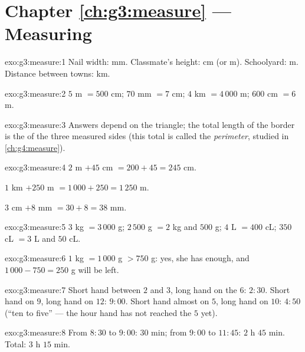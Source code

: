 \section*{Chapter \ref{ch:g3:measure} --- Measuring}

\begin{solution}{exo:g3:measure:1}
Nail width: mm. Classmate's height: cm (or m). Schoolyard: m.
Distance between towns: km.
\end{solution}

\begin{solution}{exo:g3:measure:2}
$5$ m $= 500$ cm; \quad $70$ mm $= 7$ cm; \quad
$4$ km $= 4\,000$ m; \quad $600$ cm $= 6$ m.
\end{solution}

\begin{solution}{exo:g3:measure:3}
Answers depend on the triangle; the total length of the border is the
 of the three measured sides (this total is called the
\emph{perimeter}, studied in \cref{ch:g4:measure}).
\end{solution}

\begin{solution}{exo:g3:measure:4}
$2$ m $+ 45$ cm $= 200 + 45 = 245$ cm.

$1$ km $+ 250$ m $= 1\,000 + 250 = 1\,250$ m.

$3$ cm $+ 8$ mm $= 30 + 8 = 38$ mm.
\end{solution}

\begin{solution}{exo:g3:measure:5}
$3$ kg $= 3\,000$ g; \quad $2\,500$ g $= 2$ kg and $500$ g; \quad
$4$ L $= 400$ cL; \quad $350$ cL $= 3$ L and $50$ cL.
\end{solution}

\begin{solution}{exo:g3:measure:6}
$1$ kg $= 1\,000$ g $> 750$ g: yes, she has enough, and
$1\,000 - 750 = 250$ g will be left.
\end{solution}

\begin{solution}{exo:g3:measure:7}
Short hand between $2$ and $3$, long hand on the $6$: $2{:}30$.
Short hand on $9$, long hand on $12$: $9{:}00$. Short hand almost on
$5$, long hand on $10$: $4{:}50$ (``ten to five'' --- the hour hand
has not reached the $5$ yet).
\end{solution}

\begin{solution}{exo:g3:measure:8}
From $8{:}30$ to $9{:}00$: $30$ min; from $9{:}00$ to $11{:}45$:
$2$ h $45$ min. Total: $3$ h $15$ min.
\end{solution}

